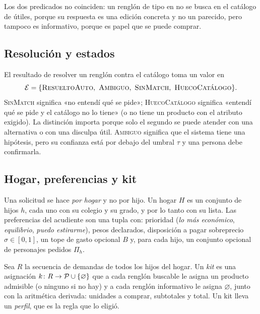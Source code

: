 Los dos predicados no coinciden: un renglón de tipo  en
 no se busca en el catálogo de útiles, porque su
respuesta es una edición concreta y no un parecido, pero tampoco es
informativo, porque es papel que se puede comprar.

\subsection{Resolución y estados}

\begin{definicion}
\label{def:estados}
El resultado de resolver un renglón contra el catálogo toma un valor en
\[
  \Est = \{\textsc{ResueltoAuto},\ \textsc{Ambiguo},\ \textsc{SinMatch},\
          \textsc{HuecoCatálogo}\}.
\]
\textsc{SinMatch} significa «no entendí qué se pide»; \textsc{HuecoCatálogo}
significa «entendí qué se pide y el catálogo no lo tiene» (o no tiene un
producto con el atributo exigido). La distinción importa porque solo el
segundo se puede atender con una alternativa o con una disculpa útil.
\textsc{Ambiguo} significa que el sistema tiene una hipótesis, pero su
confianza está por debajo del umbral $\tau$ y una persona debe confirmarla.
\end{definicion}

\subsection{Hogar, preferencias y kit}

Una solicitud se hace \emph{por hogar} y no por hijo. Un hogar $H$ es un
conjunto de hijos $h$, cada uno con su colegio y su grado, y por lo tanto con
su lista. Las preferencias del acudiente son una tupla con: prioridad
(\emph{lo más económico}, \emph{equilibrio}, \emph{puedo estirarme}), pesos
declarados, disposición a pagar sobreprecio $\sigma\in[0,1]$, un tope de gasto
opcional $B$ y, para cada hijo, un conjunto opcional de personajes pedidos
$\Pi_h$.

\begin{definicion}[Kit]
\label{def:kit}
Sea $R$ la secuencia de demandas de todos los hijos del hogar. Un \emph{kit}
es una asignación $k\colon R\to\mathcal{P}\cup\{\varnothing\}$ que a cada renglón
buscable le asigna un producto admisible (o ninguno si no hay) y a cada
renglón informativo le asigna $\varnothing$, junto con la aritmética derivada:
unidades a comprar, subtotales y total. Un kit lleva un \emph{perfil}, que es
la regla que lo eligió.
\end{definicion}

